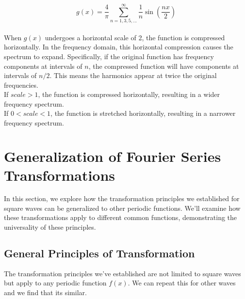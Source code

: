 \documentclass{article}
\begin{document}
    \begin{equation}
g(x) = \frac{4}{\pi} \sum_{n=1,3,5,...}^{\infty} \frac{1}{n} \sin\left(\frac{nx}{2}\right)
    \end{equation}\\
When $g(x)$ undergoes a horizontal scale of 2, the function is compressed horizontally. In the frequency domain, this horizontal compression causes the spectrum to expand. Specifically, if the original function has frequency components at intervals of $n$, the compressed function will have components at intervals of $n/2$. This means the harmonics appear at twice the original frequencies.\\
If $scale>1$, the function is compressed horizontally, resulting in a wider frequency spectrum.\\
If $0<scale<1$, the function is stretched horizontally, resulting in a narrower frequency spectrum.

    
\section{Generalization of Fourier Series Transformations}
In this section, we explore how the transformation principles we established for square waves can be generalized to other periodic functions. We'll examine how these transformations apply to different common functions, demonstrating the universality of these principles.

\subsection{General Principles of Transformation}
The transformation principles we've established are not limited to square waves but apply to any periodic function $f(x)$. We can repeat this for other waves and we find that its similar.
\end{document}
